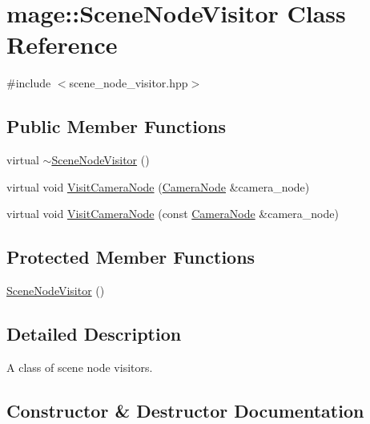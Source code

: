 \hypertarget{classmage_1_1_scene_node_visitor}{}\section{mage\+:\+:Scene\+Node\+Visitor Class Reference}
\label{classmage_1_1_scene_node_visitor}


{\ttfamily \#include $<$scene\+\_\+node\+\_\+visitor.\+hpp$>$}

\subsection*{Public Member Functions}
\begin{DoxyCompactItemize}
\item 
virtual \hyperlink{classmage_1_1_scene_node_visitor_ac45f02e28abeeb9220b0be954ca6a513}{$\sim$\+Scene\+Node\+Visitor} ()
\item 
virtual void \hyperlink{classmage_1_1_scene_node_visitor_a01d831e494396ab678ce0c29b008a398}{Visit\+Camera\+Node} (\hyperlink{classmage_1_1_camera_node}{Camera\+Node} \&camera\+\_\+node)
\item 
virtual void \hyperlink{classmage_1_1_scene_node_visitor_a4a3bb0c3ad6253c919259efabbccfab9}{Visit\+Camera\+Node} (const \hyperlink{classmage_1_1_camera_node}{Camera\+Node} \&camera\+\_\+node)
\end{DoxyCompactItemize}
\subsection*{Protected Member Functions}
\begin{DoxyCompactItemize}
\item 
\hyperlink{classmage_1_1_scene_node_visitor_a6a259a0ce19107bb644482b86c4bd27a}{Scene\+Node\+Visitor} ()
\end{DoxyCompactItemize}


\subsection{Detailed Description}
A class of scene node visitors. 

\subsection{Constructor \& Destructor Documentation}
\hypertarget{classmage_1_1_scene_node_visitor_ac45f02e28abeeb9220b0be954ca6a513}{}\label{classmage_1_1_scene_node_visitor_ac45f02e28abeeb9220b0be954ca6a513} 
